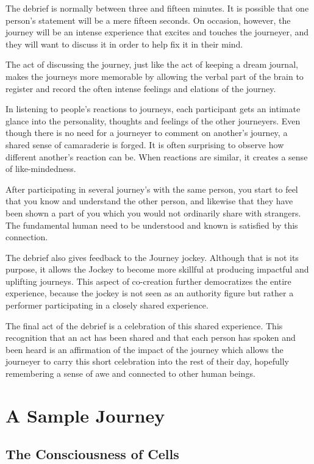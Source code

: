 \documentclass[12pt]{book}
\begin{document}
The debrief is normally between three and fifteen minutes. It is possible that one person’s statement will be a mere fifteen seconds. On occasion, however, the journey will be an intense experience that excites and touches the journeyer, and they will want to discuss it in order to help fix it in their mind.

The act of discussing the journey, just like the act of keeping a dream journal, makes the journeys more memorable by allowing the verbal part of the brain to register and record the often intense feelings and elations of the journey.
					
In listening to people’s reactions to journeys, each participant gets an intimate glance into the personality, thoughts and feelings of the other journeyers. Even though there is no need for a journeyer to comment on another’s journey, a shared sense of camaraderie is forged. It is often surprising to observe how different another’s reaction can be. When reactions are similar, it creates a sense of like-mindedness.
					
After participating in several journey’s with the same person, you start to feel that you know and understand the other person, and likewise that they have been shown a part of you which you would not ordinarily share with strangers. The fundamental human need to be understood and known is satisfied by this connection.
					
The debrief also gives feedback to the Journey jockey. Although that is not its purpose, it allows  the Jockey to become more skillful at producing impactful and uplifting journeys. This aspect of co-creation further democratizes the entire experience, because the jockey is not seen as an authority figure but rather a performer participating in a closely shared experience.
				
					
The final act of the debrief is a celebration of this shared experience. This recognition that an act has been shared and that each person has spoken and been heard is an affirmation of the impact of the journey which allows the journeyer to carry this short celebration into the rest of their day, hopefully remembering a sense of awe and connected to other human beings.


\chapter{A Sample Journey}


\section{The Consciousness of Cells}
\end{document}
